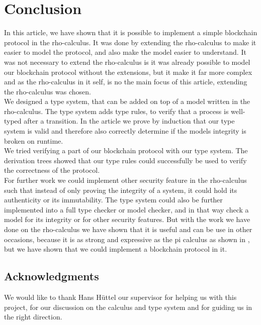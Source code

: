 \section{Conclusion}
In this article, we have shown that it is possible to implement a simple blockchain protocol in the rho-calculus. It was done by extending the rho-calculus to make it easier to model the protocol, and also make the model easier to understand. It was not necessary to extend the rho-calculus is it was already possible to model our blockchain protocol without the extensions, but it make it far more complex and as the rho-calculus in it self, is no the main focus of this article, extending the rho-calculus was chosen.\\
We designed a type system, that can be added on top of a model written in the rho-calculus. The type system adds type rules, to verify that a process is well-typed after a transition. In the article we prove by induction that our type system is valid and therefore also correctly determine if the models integrity is broken on runtime.\\
We tried verifying a part of our blockchain protocol with our type system. The derivation trees showed that our type rules could successfully be used to verify the correctness of the protocol.\\

For further work we could implement other security feature in the rho-calculus such that instead of only proving the integrity of a system, it could hold its authenticity or its immutability. The type system could also be further implemented into a full type checker or model checker, and in that way check a model for its integrity or for other security features. But with the work we have done on the rho-calculus we have shown that it is useful and can be use in other occasions, because it is as strong and expressive as the pi calculus as shown in \citep{Meredith2005}, but we have shown that we could implement a blockchain protocol in it.





\subsection*{Acknowledgments}
We would like to thank Hans Hüttel our supervisor for helping us with this project, for our discussion on the calculus and type system and for guiding us in the right direction.
